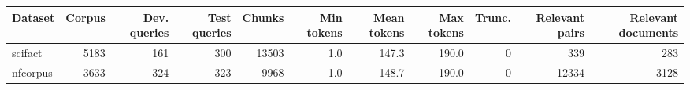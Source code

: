 \begin{tabular}{lrrrrrrrrrr}
\toprule
Dataset & Corpus & Dev. queries & Test queries & Chunks & Min tokens & Mean tokens & Max tokens & Trunc. & Relevant pairs & Relevant documents\\
\midrule
scifact & 5183 & 161 & 300 & 13503 & 1.0 & 147.3 & 190.0 & 0 & 339 & 283\\
nfcorpus & 3633 & 324 & 323 & 9968 & 1.0 & 148.7 & 190.0 & 0 & 12334 & 3128\\
\bottomrule
\end{tabular}
